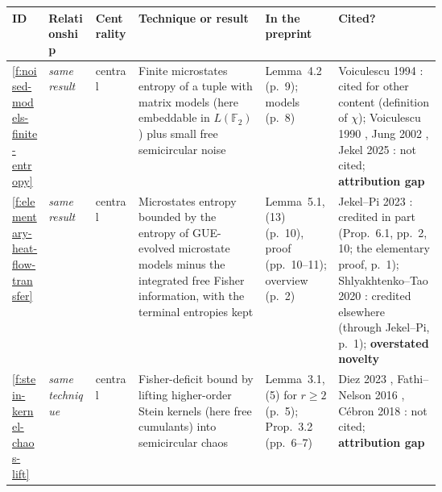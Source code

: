 \documentclass[11pt]{article}
\newcommand{\rel}[1]{\textit{#1}}
\newcommand{\attrgap}{\textbf{attribution gap}}
\newcommand{\overstated}{\textbf{overstated novelty}}
\newcounter{finding}
\begin{document}
\begin{center}\footnotesize
\begin{xltabular}{\linewidth}{@{}l >{\raggedright\arraybackslash}p{0.11\linewidth} >{\raggedright\arraybackslash}p{0.10\linewidth} >{\raggedright\arraybackslash}X >{\raggedright\arraybackslash}p{0.17\linewidth} >{\raggedright\arraybackslash}p{0.24\linewidth}@{}}
\toprule
ID & Relationship & Centrality & Technique or result & In the preprint & Cited?\\
\midrule
\endhead
\ref{f:noised-models-finite-entropy} & \rel{same result} & central &
Finite microstates entropy of a tuple with matrix models (here embeddable in $L(\mathbb F_2)$) plus small free semicircular noise &
Lemma~4.2 (p.~9); models (p.~8) &
Voiculescu 1994 \cite{Voiculescu1994-AnaloguesEntropyFisherII}: cited for other content (definition of $\chi$); Voiculescu 1990 \cite{NL-Voiculescu1990}, Jung 2002 \cite{Jung2002-FreeEntropyDimensionLemma}, Jekel 2025 \cite{Jekel2025CMP-InformationGeometryTypesLargeN}: not cited; \attrgap\\
\addlinespace
\ref{f:elementary-heat-flow-transfer} & \rel{same result} & central &
Microstates entropy bounded by the entropy of GUE-evolved microstate models minus the integrated free Fisher information, with the terminal entropies kept &
Lemma~5.1, (13) (p.~10), proof (pp.~10--11); overview (p.~2) &
Jekel--Pi 2023 \cite{JekelPi2023-ElementaryProofChiLeqChiStar}: credited in part (Prop.~6.1, pp.~2, 10; the elementary proof, p.~1); Shlyakhtenko--Tao 2020 \cite{ShlyakhtenkoTao2020-FractionalFreeConvolutionPowers}: credited elsewhere (through Jekel--Pi, p.~1); \overstated\\
\addlinespace
\ref{f:stein-kernel-chaos-lift} & \rel{same technique} & central &
Fisher-deficit bound by lifting higher-order Stein kernels (here free cumulants) into semicircular chaos &
Lemma~3.1, (5) for $r\ge2$ (p.~5); Prop.~3.2 (pp.~6--7) &
Diez 2023 \cite{Diez2023-FreeSteinKernelsHigherOrderDerivatives}, Fathi--Nelson 2016 \cite{FathiNelson2016-FreeSteinKernelsFreeLSI}, Cébron 2018 \cite{Cebron2018-QuantitativeFourthMomentFree}: not cited; \attrgap\\

\end{xltabular}
\end{center}
\end{document}
